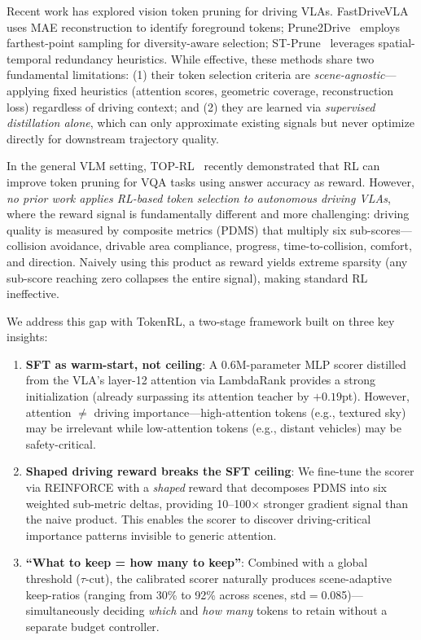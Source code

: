 \documentclass[letterpaper]{article} %
\newcommand{\ours}{TokenRL}
\begin{document}
Recent work has explored vision token pruning for driving VLAs.
FastDriveVLA~\citep{fastdrivevla2026} uses MAE reconstruction to identify foreground tokens;
Prune2Drive~\citep{prune2drive2026} employs farthest-point sampling for diversity-aware selection;
ST-Prune~\citep{stprune2026} leverages spatial-temporal redundancy heuristics.
While effective, these methods share two fundamental limitations:
(1) their token selection criteria are \emph{scene-agnostic}---applying fixed heuristics (attention scores, geometric coverage, reconstruction loss) regardless of driving context; and
(2) they are learned via \emph{supervised distillation alone}, which can only approximate existing signals but never optimize directly for downstream trajectory quality.

In the general VLM setting, TOP-RL~\citep{toprl2026} recently demonstrated that RL can improve token pruning for VQA tasks using answer accuracy as reward.
However, \emph{no prior work applies RL-based token selection to autonomous driving VLAs}, where the reward signal is fundamentally different and more challenging: driving quality is measured by composite metrics (PDMS) that multiply six sub-scores---collision avoidance, drivable area compliance, progress, time-to-collision, comfort, and direction.
Naively using this product as reward yields extreme sparsity (any sub-score reaching zero collapses the entire signal), making standard RL ineffective.

We address this gap with \ours{}, a two-stage framework built on three key insights:
\begin{enumerate}[nosep,leftmargin=*]
\item \textbf{SFT as warm-start, not ceiling}: A 0.6M-parameter MLP scorer distilled from the VLA's layer-12 attention via LambdaRank provides a strong initialization (already surpassing its attention teacher by $+0.19$pt). However, attention $\neq$ driving importance---high-attention tokens (e.g., textured sky) may be irrelevant while low-attention tokens (e.g., distant vehicles) may be safety-critical.
\item \textbf{Shaped driving reward breaks the SFT ceiling}: We fine-tune the scorer via REINFORCE with a \emph{shaped} reward that decomposes PDMS into six weighted sub-metric deltas, providing 10--100$\times$ stronger gradient signal than the naive product. This enables the scorer to discover driving-critical importance patterns invisible to generic attention.
\item \textbf{``What to keep = how many to keep''}: Combined with a global threshold ($\tau$-cut), the calibrated scorer naturally produces scene-adaptive keep-ratios (ranging from 30\% to 92\% across scenes, std$=$0.085)---simultaneously deciding \emph{which} and \emph{how many} tokens to retain without a separate budget controller.
\end{enumerate}
\end{document}
